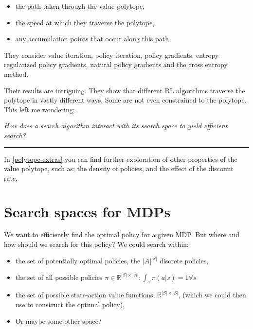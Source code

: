 \begin{itemize}
\tightlist
  \item the path taken through the value polytope,
  \item the speed at which they traverse the polytope,
  \item any accumulation points that occur along this path.
\end{itemize}


They consider value iteration, policy iteration, policy gradients, entropy regularized policy gradients,
natural policy gradients and the cross entropy method.

Their results are intriguing. They show that different RL algorithms traverse the polytope in vastly different ways.
Some are not even constrained to the polytope. This left me wondering;

\begin{displayquote}
  \textsl{How does a search algorithm interact with its search space to yield efficient search?}
\end{displayquote}

\begin{center}\rule{0.5\linewidth}{\linethickness}\end{center}

In \ref{polytope-extras} you can find further exploration of other properties of
the value polytope, such as; the density of policies, and the effect of the discount
rate.

\newpage
\section{Search spaces for MDPs}\label{search-spaces-mdps}

We want to efficiently find the optimal policy for a given MDP. But where and how should we
search for this policy? We could search within;

\begin{itemize}
\tightlist
  \item the set of potentially optimal policies, the $|A|^{|S|}$ discrete policies,
  \item the set of all possible policies $\pi \in \mathbb R^{|S| \times |A|}: \int_a \pi(a|s) = 1 \forall s $
  \item the set of possible state-action value functions, $\mathbb R^{|S|\times|S|}$,
  (which we could then use to construct the optimal policy),
  \item Or maybe some other space?
\end{itemize}

